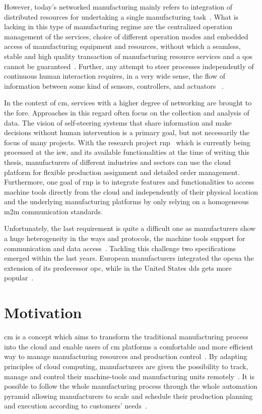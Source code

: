 \documentclass[
a4paper,
twoside,
headsepline,
cleardoublepage=empty,
parskip=half,
draft=false
]{scrbook}
\begin{document}
		However, today's networked manufacturing mainly refers to integration of distributed resources for undertaking a single manufacturing task~\cite{li2010cloud}.
		What is lacking in this type of manufacturing regime are the centralized operation management of the services, choice of different operation modes and embedded access of manufacturing equipment and resources, without which a seamless, stable and high quality transaction of manufacturing resource services and a \gls{qos} cannot be guaranteed~\cite{tao2010theory}.
		Further, any attempt to steer processes independently of continuous human interaction requires, in a very wide sense, the flow of information between some kind of sensors, controllers, and actuators ~\cite{sauter2011evolution}.

		In the context of \gls{cm}, services with a higher degree of networking are brought to the fore.
		Approaches in this regard often focus on the collection and analysis of data. The vision of self-steering systems that share information and make decisions without human intervention is a primary goal, but not necessarily the focus of many projects.
		With the research project \gls{rnp}~\cite{ellwein2016} which is currently being processed at the \gls{isw}, and its available functionalities at the time of writing this thesis, manufacturers of different industries and sectors can use the cloud platform for flexible production assignment and detailed order management.
		Furthermore, one goal of \gls{rnp} is to integrate features and functionalities to access machine tools directly from the cloud and independently of their physical location and the underlying manufacturing platforms by only relying on a homogeneous \gls{m2m} communication standards.

		Unfortunately, the last requirement is quite a difficult one as manufacturers show a huge heterogeneity in the ways and protocols, the machine tools support for communication and data access~\cite{xu2012cloud}.
		Tackling this challenge two specifications emerged within the last years.
		European manufacturers integrated the \gls{opcua} the extension of its predecessor \gls{opc}, while in the United States \gls{dds} gets more popular~\cite{niggemann2015data}.

		\section{Motivation}\label{sec:motivation}

			\gls{cm} is a concept which aims to transform the traditional manufacturing process into the cloud and enable users of \gls{cm} platforms a comfortable and more efficient way to manage manufacturing resources and production control~\cite{xu2012cloud}.
			By adapting principles of cloud computing, manufacturers are given the possibility to track, manage and control their machine-tools and manufacturing units remotely~\cite{tao2011cloud}.
			It is possible to follow the whole manufacturing process through the whole automation pyramid allowing manufacturers to scale and schedule their production planning and execution according to customers' needs~\cite{tao2011cloud}.
\end{document}
